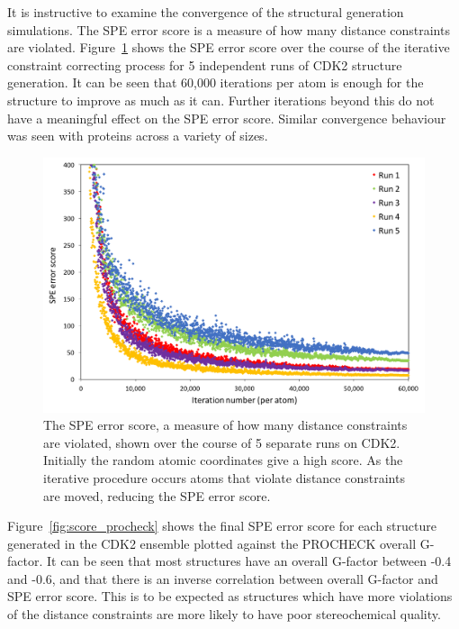 It is instructive to examine the convergence of the structural generation simulations.
The SPE error score is a measure of how many distance constraints are violated.
Figure~\ref{fig:spe_convergence} shows the SPE error score over the course of the iterative constraint correcting process for 5 independent runs of CDK2 structure generation.
It can be seen that 60,000 iterations per atom is enough for the structure to improve as much as it can.
Further iterations beyond this do not have a meaningful effect on the SPE error score.
Similar convergence behaviour was seen with proteins across a variety of sizes.


\begin{figure}
\centering

\includegraphics[width=\textwidth]{figures/spe_convergence/spe_convergence}

\caption{The SPE error score, a measure of how many distance constraints are violated, shown over the course of 5 separate runs on CDK2.
Initially the random atomic coordinates give a high score.
As the iterative procedure occurs atoms that violate distance constraints are moved, reducing the SPE error score.}

\label{fig:spe_convergence}
\end{figure}


Figure~\ref{fig:score_procheck} shows the final SPE error score for each structure generated in the CDK2 ensemble plotted against the PROCHECK overall G-factor.
It can be seen that most structures have an overall G-factor between -0.4 and -0.6, and that there is an inverse correlation between overall G-factor and SPE error score.
This is to be expected as structures which have more violations of the distance constraints are more likely to have poor stereochemical quality.


